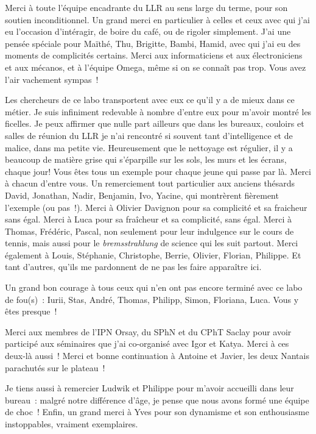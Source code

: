 Merci à toute l'équipe
encadrante du LLR au sens large du terme, pour son soutien
inconditionnel. Un grand merci en particulier à celles et ceux avec
qui j'ai eu l'occasion d'intéragir, de boire du café, ou de
rigoler simplement. J'ai une pensée spéciale pour Maïthé, Thu, Brigitte, Bambi,
Hamid, avec qui j'ai eu des moments de complicités certains. Merci aux
informaticiens et aux électroniciens et aux mécanos, et à l'équipe
Omega, même si on se connaît pas trop. Vous avez l'air vachement
sympas~! 


Les chercheurs de ce labo transportent avec eux ce 
qu'il y a de mieux dans ce métier. Je suis infiniment redevable à
nombre d'entre eux pour m'avoir montré les ficelles. Je peux affirmer
que nulle part ailleurs que dans les bureaux, couloirs et salles de
réunion du LLR je n'ai rencontré si souvent tant d'intelligence et de
malice, dans ma petite vie. Heureusement que le nettoyage est 
régulier, il y a beaucoup de matière grise qui s'éparpille sur les
sols, les murs et les écrans, chaque jour! Vous êtes tous un exemple pour
chaque jeune qui passe par là. Merci à chacun d'entre vous. Un
remerciement tout particulier aux
anciens thésards David, Jonathan, Nadir, Benjamin, Ivo, Yacine, qui
montrèrent fièrement l'exemple (ou pas~!). Merci à Olivier Davignon
pour sa complicité et sa fraicheur sans égal. Merci à Luca pour sa
fraîcheur et sa complicité, sans égal. Merci à Thomas,
Frédéric, Pascal, non seulement pour leur indulgence sur le cours de
tennis, mais aussi pour le \textit{bremsstrahlung} de science qui les suit
partout. Merci également à Louis, Stéphanie, Christophe, Berrie,
Olivier, Florian, Philippe. Et tant d'autres, qu'ils me pardonnent de
ne pas les faire apparaître ici. 

Un grand bon courage à tous ceux qui
n'en ont pas encore
terminé avec ce labo de fou(s)~: Iurii, Stas, André, Thomas, Philipp,
Simon, Floriana, Luca. Vous y êtes presque~!

Merci aux membres de l'IPN Orsay, du SPhN et du CPhT Saclay pour avoir
participé aux séminaires que j'ai co-organisé avec Igor et
Katya. Merci à ces deux-là aussi~! Merci et bonne continuation à
Antoine et Javier, les deux Nantais parachutés sur le plateau~!

Je tiens aussi à remercier Ludwik et Philippe pour
m'avoir accueilli dans leur bureau~: malgré notre
différence d'âge, je pense que nous avons formé une équipe de choc~!
Enfin, un grand merci à Yves pour son dynamisme et son enthousiasme
instoppables, vraiment exemplaires.


